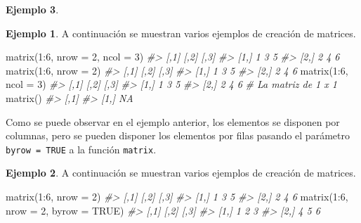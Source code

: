 \documentclass[
]{book}
\newenvironment{Shaded}{\begin{snugshade}}{\end{snugshade}}
\newcommand{\AttributeTok}[1]{\textcolor[rgb]{0.77,0.63,0.00}{#1}}
\newcommand{\CommentTok}[1]{\textcolor[rgb]{0.56,0.35,0.01}{\textit{#1}}}
\newcommand{\ConstantTok}[1]{\textcolor[rgb]{0.00,0.00,0.00}{#1}}
\newcommand{\DecValTok}[1]{\textcolor[rgb]{0.00,0.00,0.81}{#1}}
\newcommand{\FunctionTok}[1]{\textcolor[rgb]{0.00,0.00,0.00}{#1}}
\newcommand{\NormalTok}[1]{#1}
\newcommand{\SpecialCharTok}[1]{\textcolor[rgb]{0.00,0.00,0.00}{#1}}
\theoremstyle{definition}
\theoremstyle{definition}
\newtheorem{example}{Ejemplo}[chapter]
\theoremstyle{definition}
\theoremstyle{definition}
\theoremstyle{remark}
\begin{document}
\begin{example}
\begin{example}

A continuación se muestran varios ejemplos de creación de matrices.

\begin{Shaded}
\begin{Highlighting}[]
\FunctionTok{matrix}\NormalTok{(}\DecValTok{1}\SpecialCharTok{:}\DecValTok{6}\NormalTok{, }\AttributeTok{nrow =} \DecValTok{2}\NormalTok{, }\AttributeTok{ncol =} \DecValTok{3}\NormalTok{)}
\CommentTok{\#\textgreater{}      [,1] [,2] [,3]}
\CommentTok{\#\textgreater{} [1,]    1    3    5}
\CommentTok{\#\textgreater{} [2,]    2    4    6}
\FunctionTok{matrix}\NormalTok{(}\DecValTok{1}\SpecialCharTok{:}\DecValTok{6}\NormalTok{, }\AttributeTok{nrow =} \DecValTok{2}\NormalTok{)}
\CommentTok{\#\textgreater{}      [,1] [,2] [,3]}
\CommentTok{\#\textgreater{} [1,]    1    3    5}
\CommentTok{\#\textgreater{} [2,]    2    4    6}
\FunctionTok{matrix}\NormalTok{(}\DecValTok{1}\SpecialCharTok{:}\DecValTok{6}\NormalTok{, }\AttributeTok{ncol =} \DecValTok{3}\NormalTok{)}
\CommentTok{\#\textgreater{}      [,1] [,2] [,3]}
\CommentTok{\#\textgreater{} [1,]    1    3    5}
\CommentTok{\#\textgreater{} [2,]    2    4    6}
\CommentTok{\# La matriz de 1 x 1 }
\FunctionTok{matrix}\NormalTok{()}
\CommentTok{\#\textgreater{}      [,1]}
\CommentTok{\#\textgreater{} [1,]   NA}
\end{Highlighting}
\end{Shaded}

\end{example}

Como se puede observar en el ejemplo anterior, los elementos se disponen por columnas, pero se pueden disponer los elementos por filas pasando el parámetro \texttt{byrow\ =\ TRUE} a la función \texttt{matrix}.

\begin{example}

A continuación se muestran varios ejemplos de creación de matrices.

\begin{Shaded}
\begin{Highlighting}[]
\FunctionTok{matrix}\NormalTok{(}\DecValTok{1}\SpecialCharTok{:}\DecValTok{6}\NormalTok{, }\AttributeTok{nrow =} \DecValTok{2}\NormalTok{)}
\CommentTok{\#\textgreater{}      [,1] [,2] [,3]}
\CommentTok{\#\textgreater{} [1,]    1    3    5}
\CommentTok{\#\textgreater{} [2,]    2    4    6}
\FunctionTok{matrix}\NormalTok{(}\DecValTok{1}\SpecialCharTok{:}\DecValTok{6}\NormalTok{, }\AttributeTok{nrow =} \DecValTok{2}\NormalTok{, }\AttributeTok{byrow =} \ConstantTok{TRUE}\NormalTok{)}
\CommentTok{\#\textgreater{}      [,1] [,2] [,3]}
\CommentTok{\#\textgreater{} [1,]    1    2    3}
\CommentTok{\#\textgreater{} [2,]    4    5    6}
\end{Highlighting}
\end{Shaded}


\end{example}
\end{example}
\end{document}

